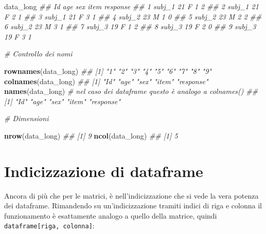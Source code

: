 \documentclass[
]{book}
\newenvironment{Shaded}{\begin{snugshade}}{\end{snugshade}}
\newcommand{\CommentTok}[1]{\textcolor[rgb]{0.56,0.35,0.01}{\textit{#1}}}
\newcommand{\KeywordTok}[1]{\textcolor[rgb]{0.13,0.29,0.53}{\textbf{#1}}}
\newcommand{\NormalTok}[1]{#1}
\begin{document}
\begin{Shaded}
\begin{Highlighting}[]
\NormalTok{data_long}
\CommentTok{##       Id age sex item response}
\CommentTok{## 1 subj_1  21   F    1        2}
\CommentTok{## 2 subj_1  21   F    2        1}
\CommentTok{## 3 subj_1  21   F    3        1}
\CommentTok{## 4 subj_2  23   M    1        0}
\CommentTok{## 5 subj_2  23   M    2        2}
\CommentTok{## 6 subj_2  23   M    3        1}
\CommentTok{## 7 subj_3  19   F    1        2}
\CommentTok{## 8 subj_3  19   F    2        0}
\CommentTok{## 9 subj_3  19   F    3        1}

\CommentTok{# Controllo dei nomi}

\KeywordTok{rownames}\NormalTok{(data_long)}
\CommentTok{## [1] "1" "2" "3" "4" "5" "6" "7" "8" "9"}
\KeywordTok{colnames}\NormalTok{(data_long)}
\CommentTok{## [1] "Id"       "age"      "sex"      "item"     "response"}
\KeywordTok{names}\NormalTok{(data_long) }\CommentTok{# nel caso dei dataframe questo è analogo a colnames()}
\CommentTok{## [1] "Id"       "age"      "sex"      "item"     "response"}

\CommentTok{# Dimensioni}

\KeywordTok{nrow}\NormalTok{(data_long)}
\CommentTok{## [1] 9}
\KeywordTok{ncol}\NormalTok{(data_long)}
\CommentTok{## [1] 5}
\end{Highlighting}
\end{Shaded}

\hypertarget{indicizzazione-di-dataframe}{%
\section{Indicizzazione di dataframe}\label{indicizzazione-di-dataframe}}

Ancora di più che per le matrici, è nell'indicizzazione che si vede la vera potenza dei dataframe. Rimandendo su un'indicizzazione tramiti indici di riga e colonna il funzionamento è esattamente analogo a quello della matrice, quindi \texttt{dataframe{[}riga,\ colonna{]}}:
\end{document}
